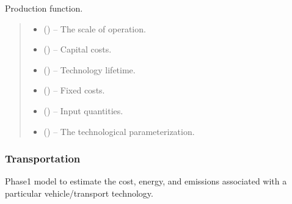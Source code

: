 \documentclass[letterpaper,10pt,english]{sphinxmanual}
\begin{document}
\begin{fulllineitems}
\label{\detokenize{technology:technology.utility_pv.production}}
\pysigstartsignatures
{}
\pysigstopsignatures
\sphinxAtStartPar
Production function.
\begin{quote}\begin{description}
\begin{itemize}
\item {} 
\sphinxAtStartPar
{} () – The scale of operation.

\item {} 
\sphinxAtStartPar
{} () – Capital costs.

\item {} 
\sphinxAtStartPar
{} () – Technology lifetime.

\item {} 
\sphinxAtStartPar
{} () – Fixed costs.

\item {} 
\sphinxAtStartPar
{} () – Input quantities.

\item {} 
\sphinxAtStartPar
{} () – The technological parameterization.

\end{itemize}

\end{description}\end{quote}

\end{fulllineitems}



\subsubsection{Transportation}
\label{\detokenize{technology:module-technology.transport_model}}\label{\detokenize{technology:transportation}}
\sphinxAtStartPar
Phase\sphinxhyphen{}1 model to estimate the cost, energy, and emissions associated with a
particular vehicle/transport technology.
\end{document}
